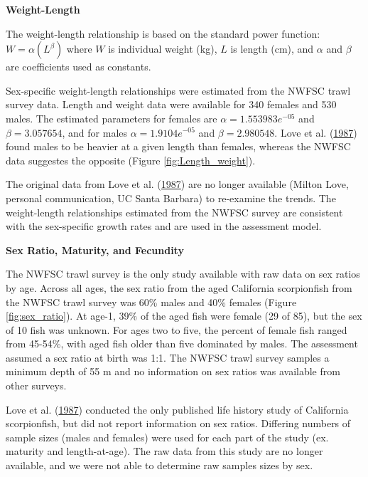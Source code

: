 \documentclass[12pt,]{article}
\begin{document}
\vspace{.5cm}

\textbf{Weight-Length}

The weight-length relationship is based on the standard power function:
\(W = \alpha(L^\beta)\) where \(W\) is individual weight (kg), \(L\) is
length (cm), and \(\alpha\) and \(\beta\) are coefficients used as
constants.

Sex-specific weight-length relationships were estimated from the NWFSC
trawl survey data. Length and weight data were available for 340 females
and 530 males. The estimated parameters for females are
\(\alpha = 1.553983e^{-05}\) and \(\beta = 3.057654\), and for males
\(\alpha = 1.9104e^{-05}\) and \(\beta = 2.980548\). Love et al.
(\protect\hyperlink{ref-Love1987}{1987}) found males to be heavier at a
given length than females, whereas the NWFSC data suggestes the opposite
(Figure \ref{fig:Length_weight}).

The original data from Love et al.
(\protect\hyperlink{ref-Love1987}{1987}) are no longer available (Milton
Love, personal communication, UC Santa Barbara) to re-examine the
trends. The weight-length relationships estimated from the NWFSC survey
are consistent with the sex-specific growth rates and are used in the
assessment model.

\vspace{.5cm}

\textbf{Sex Ratio, Maturity, and Fecundity}

The NWFSC trawl survey is the only study available with raw data on sex
ratios by age. Across all ages, the sex ratio from the aged California
scorpionfish from the NWFSC trawl survey was 60\% males and 40\% females
(Figure \ref{fig:sex_ratio}). At age-1, 39\% of the aged fish were
female (29 of 85), but the sex of 10 fish was unknown. For ages two to
five, the percent of female fish ranged from 45-54\%, with aged fish
older than five dominated by males. The assessment assumed a sex ratio
at birth was 1:1. The NWFSC trawl survey samples a minimum depth of 55 m
and no information on sex ratios was available from other surveys.

Love et al. (\protect\hyperlink{ref-Love1987}{1987}) conducted the only
published life history study of California scorpionfish, but did not
report information on sex ratios. Differing numbers of sample sizes
(males and females) were used for each part of the study (ex. maturity
and length-at-age). The raw data from this study are no longer
available, and we were not able to determine raw samples sizes by sex.
\end{document}
